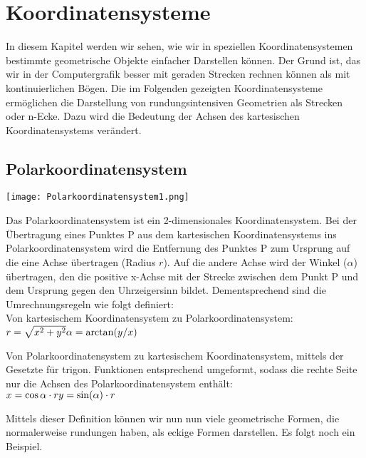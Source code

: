 \section{Koordinatensysteme}

In diesem Kapitel werden wir sehen, wie wir in speziellen Koordinatensystemen bestimmte geometrische Objekte einfacher Darstellen können. Der Grund ist, das wir in der Computergrafik besser mit geraden Strecken rechnen können als mit kontinuierlichen Bögen. Die im Folgenden gezeigten Koordinatensysteme ermöglichen die Darstellung von rundungsintensiven Geometrien als Strecken oder n-Ecke. Dazu wird die Bedeutung der Achsen des kartesischen Koordinatensystems verändert.

\subsection{Polarkoordinatensystem}

\texttt{[image: Polarkoordinatensystem1.png]}

Das Polarkoordinatensystem ist ein 2-dimensionales Koordinatensystem. Bei der Übertragung eines Punktes P aus dem kartesischen Koordinatensystems ins Polarkoordinatensystem wird die Entfernung des Punktes P zum Ursprung auf die eine Achse übertragen (Radius $r$). Auf die andere Achse wird der Winkel ($\alpha$) übertragen, den die positive x-Achse mit der Strecke zwischen dem Punkt P und dem Ursprung gegen den Uhrzeigersinn bildet. Dementsprechend sind die Umrechnungsregeln wie folgt definiert:\\

Von kartesischem Koordinatensystem zu Polarkoordinatensystem:\\
\begin{math}
    r = \sqrt{x^2 + y^2}\\
    \alpha = \arctan(y / x)
\end{math}

Von Polarkoordinatensystem zu kartesischem Koordinatensystem, mittels der Gesetzte für trigon. Funktionen entsprechend umgeformt, sodass die rechte Seite nur die Achsen des Polarkoordinatensystem enthält:\\
\begin{math}
    x = \cos{\alpha} \cdot r\\
    y = \sin(\alpha) \cdot r
\end{math}

Mittels dieser Definition können wir nun nun viele geometrische Formen, die normalerweise rundungen haben, als eckige Formen darstellen. Es folgt noch ein Beispiel.

